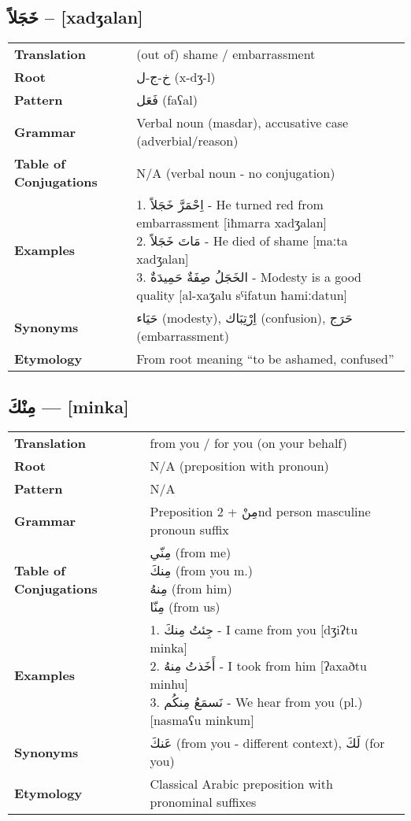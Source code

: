 \documentclass[a4paper,12pt]{article}
\begin{document}
\subsection{\textarabic{خَجَلاً} – [xadʒalan]}
\begin{tabular}{p{3cm}p{10cm}}
\toprule
\textbf{Translation} & (out of) shame / embarrassment \\
\textbf{Root} & \textarabic{خ-ج-ل} (x-dʒ-l) \\
\textbf{Pattern} & \textarabic{فَعَل} (faʕal) \\
\textbf{Grammar} & Verbal noun (masdar), accusative case (adverbial/reason) \\
\textbf{Table of Conjugations} & N/A (verbal noun - no conjugation) \\
\textbf{Examples} & \makecell[l]{\parbox{9.5cm}{
1. \textarabic{اِحْمَرَّ خَجَلاً} - He turned red from embarrassment [iħmarra xadʒalan]\\
2. \textarabic{مَاتَ خَجَلاً} - He died of shame [maːta xadʒalan]\\
3. \textarabic{الخَجَلُ صِفَةٌ حَمِيدَةٌ} - Modesty is a good quality [al-xaʒalu sˤifatun ħamiːdatun]
}} \\
\midrule
\textbf{Synonyms} & \textarabic{حَيَاء} (modesty), \textarabic{اِرْتِبَاك} (confusion), \textarabic{حَرَج} (embarrassment) \\
\textbf{Etymology} & From root meaning ``to be ashamed, confused'' \\
\bottomrule
\end{tabular}

\subsection{\textarabic{مِنْكَ} — [minka]}
\begin{tabular}{p{3cm}p{10cm}}
\toprule
\textbf{Translation} & from you / for you (on your behalf) \\
\textbf{Root} & N/A (preposition with pronoun) \\
\textbf{Pattern} & N/A \\
\textbf{Grammar} & Preposition \textarabic{مِنْ} + 2nd person masculine pronoun suffix \\
\textbf{Table of Conjugations} & \makecell[l]{
\textarabic{مِنّي} (from me) \\
\textarabic{مِنكَ} (from you m.) \\
\textarabic{مِنهُ} (from him) \\
\textarabic{مِنّا} (from us)
} \\
\textbf{Examples} & \makecell[l]{\parbox{9.5cm}{
1. \textarabic{جِئتُ مِنكَ} - I came from you [dʒiʔtu minka]\\
2. \textarabic{أَخَذتُ مِنهُ} - I took from him [ʔaxaðtu minhu]\\
3. \textarabic{نَسمَعُ مِنكُم} - We hear from you (pl.) [nasmaʕu minkum]
}} \\
\midrule
\textbf{Synonyms} & \textarabic{عَنكَ} (from you - different context), \textarabic{لَكَ} (for you) \\
\textbf{Etymology} & Classical Arabic preposition with pronominal suffixes \\
\bottomrule
\end{tabular}
\end{document}
